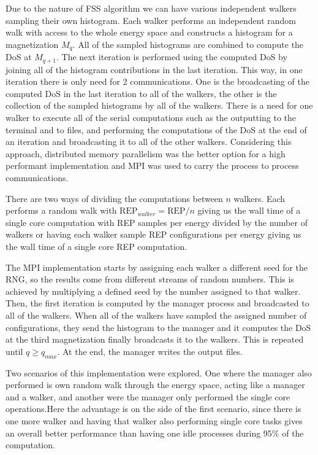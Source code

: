 	Due to the nature of FSS algorithm we can have various independent walkers sampling their own histogram. Each walker performs an independent random walk with access to the whole energy space and constructs a histogram for a magnetization $M_q$. All of the sampled histograms are combined to compute the DoS at $M_{q+1}$. The next iteration is performed using the computed DoS by joining all of the histogram contributions in the last iteration.
This way, in one iteration there is only need for 2 communications. One is the broadcasting of the computed DoS in the last iteration to all of the walkers, the other is the collection of the sampled histograms by all of the walkers. There is a need for one walker to execute all of the serial computations such as the outputting to the terminal and to files, and performing the computations of the DoS at the end of an iteration and broadcasting it to all of the other walkers. Considering this approach, distributed memory parallelism was the better option for a high performant implementation and MPI was used to carry the process to process communications.

	There are two ways of dividing the computations between $n$ walkers. Each performs a random walk with $\text{REP}_{walker} = \text{REP} / n$ giving us the wall time of a single core computation with REP samples per energy divided by the number of walkers or having each walker sample REP configurations per energy giving us the wall time of a single core REP computation.
	
	The MPI implementation starts by assigning each walker a different seed for the RNG, so the results come from different streams of random numbers. This is achieved by multiplying a defined seed by the number assigned to that walker. Then, the first iteration is computed by the manager process and broadcasted to all of the walkers. When all of the walkers have sampled the assigned number of configurations, they send the histogram to the manager and it computes the DoS at the third magnetization finally broadcasts it to the walkers. This is repeated until $q \geqslant q_{max}$. At the end, the manager writes the output files.
 
	Two scenarios of this implementation were explored. One where the manager also performed is own random walk through the energy space, acting like a manager and a walker, and another were the manager only performed the single core operations.Here the advantage is on the side of the first scenario, since there is one more walker and having that walker also performing single core tasks gives an overall better performance than having one idle processes during 95\% of the computation.

